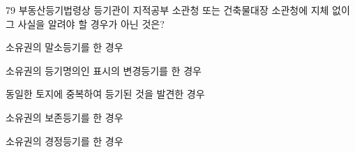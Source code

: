 \begin{question}{79}
부동산등기법령상 등기관이 지적공부 소관청 또는 건축물대장 소관청에 지체 없이 그 사실을 알려야 할 경우가 아닌 것은?
\begin{choices}
  \item 소유권의 말소등기를 한 경우
  \item 소유권의 등기명의인 표시의 변경등기를 한 경우
  \item 동일한 토지에 중복하여 등기된 것을 발견한 경우
  \item 소유권의 보존등기를 한 경우
  \item 소유권의 경정등기를 한 경우
\end{choices}
\end{question}
